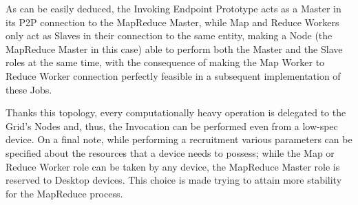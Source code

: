 As can be easily deduced, the Invoking Endpoint Prototype acts as a Master in its P2P connection to the MapReduce Master, while Map and Reduce Workers only act as Slaves in their connection to the same entity, making a Node (the MapReduce Master in this case) able to perform both the Master and the Slave roles at the same time, with the consequence of making the Map Worker to Reduce Worker connection perfectly feasible in a subsequent implementation of these Jobs.

Thanks this topology, every computationally heavy operation is delegated to the Grid's Nodes and, thus, the Invocation can be performed even from a low-spec device. On a final note, while performing a recruitment various parameters can be specified about the resources that a device needs to possess; while the Map or Reduce Worker role can be taken by any device, the MapReduce Master role is reserved to Desktop devices. This choice is made trying to attain more stability for the MapReduce process.  
